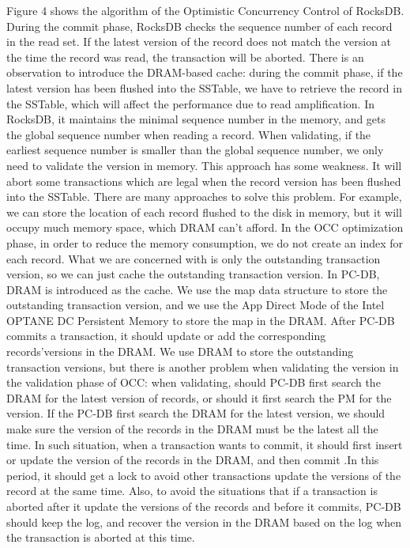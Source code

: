 Figure 4 shows the algorithm of the Optimistic Concurrency Control of RocksDB. 
During the commit phase, RocksDB checks the sequence number of each record in the read set. 
If the latest version of the record does not match the version at the time the record was read, 
the transaction will be aborted. 
There is an observation to introduce the DRAM-based cache: during the commit phase, 
if the latest version has been flushed into the SSTable, 
we have to retrieve the record in the SSTable, 
which will affect the performance due to read amplification. 
In RocksDB, it maintains the minimal sequence number in the memory, 
and gets the global sequence number when reading a record. 
When validating, if the earliest sequence number is smaller than the global sequence number, 
we only need to validate the version in memory. 
This approach has some weakness. 
It will abort some transactions which are legal when the record version has been flushed into the SSTable. 
There are many approaches to solve this problem. 
For example, we can store the location of each record flushed to the disk in memory, but it will occupy much memory space, which DRAM can't afford. 
In the OCC optimization phase, 
in order to reduce the memory consumption, we do not create an index for each record. 
What we are concerned with is only the outstanding transaction version, 
so we can just cache the outstanding transaction version. 
In PC-DB, DRAM is introduced as the cache. 
We use the map data structure to store the outstanding transaction version, 
and we use the App Direct Mode of the Intel OPTANE DC Persistent Memory to store the map in the DRAM. 
After PC-DB commits a transaction, it should update or add the corresponding records’versions in the DRAM. 
We use DRAM to store the outstanding transaction versions, 
but there is another problem when validating the version in the validation phase of OCC: when validating, 
should PC-DB first search the DRAM for the latest version of records, or  should it first search the PM for the version. 
If the PC-DB first search the DRAM for the latest version, we should make sure the version of the records in the DRAM must be the latest all the time. 
In such situation, when a transaction wants to commit, it should first insert or update the version of the records in the DRAM, 
and then commit .In this period, it should get a lock to avoid other transactions update the versions of the record at the same time. Also, to avoid the situations that if a transaction is aborted after it update the versions of the records 
and before it commits, PC-DB should keep the log, and recover the version in the DRAM based on the log when the transaction is aborted at this time. 
